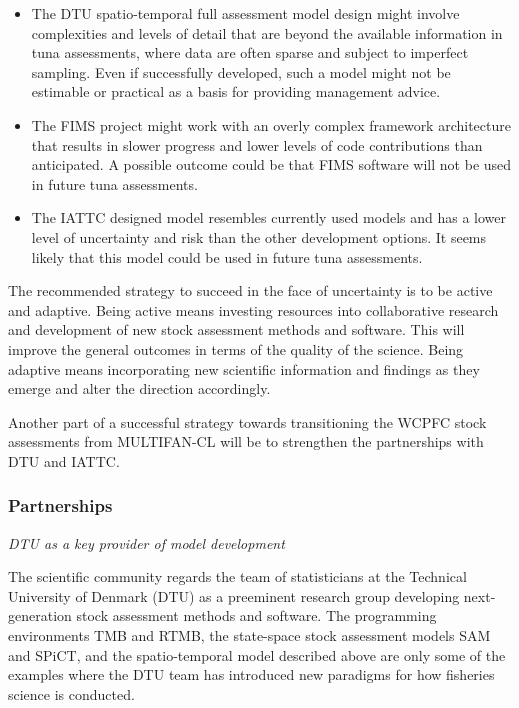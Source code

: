 \documentclass{SCreport}
\begin{document}
\begin{itemize}
  \item The DTU spatio-temporal full assessment model design might involve
  complexities and levels of detail that are beyond the available information in
  tuna assessments, where data are often sparse and subject to imperfect
  sampling. Even if successfully developed, such a model might not be estimable
  or practical as a basis for providing management advice.
  \item The FIMS project might work with an overly complex framework
  architecture that results in slower progress and lower levels of code
  contributions than anticipated. A possible outcome could be that FIMS software
  will not be used in future tuna assessments.
  \item The IATTC designed model resembles currently used models and has a lower
  level of uncertainty and risk than the other development options. It seems
  likely that this model could be used in future tuna assessments.
\end{itemize}

\vspace{1ex}

The recommended strategy to succeed in the face of uncertainty is to be active
and adaptive. Being active means investing resources into collaborative research
and development of new stock assessment methods and software. This will improve
the general outcomes in terms of the quality of the science. Being adaptive
means incorporating new scientific information and findings as they emerge and
alter the direction accordingly.

Another part of a successful strategy towards transitioning the WCPFC stock
assessments from MULTIFAN-CL will be to strengthen the partnerships with DTU and
IATTC.

\vspace{2ex}

\subsubsection{Partnerships}

\textit{DTU as a key provider of model development}

The scientific community regards the team of statisticians at the Technical
University of Denmark (DTU) as a preeminent research group developing
next-generation stock assessment methods and software. The programming
environments TMB and RTMB, the state-space stock assessment models SAM and
SPiCT, and the spatio-temporal model described above are only some of the
examples where the DTU team has introduced new paradigms for how fisheries
science is conducted.
\end{document}
